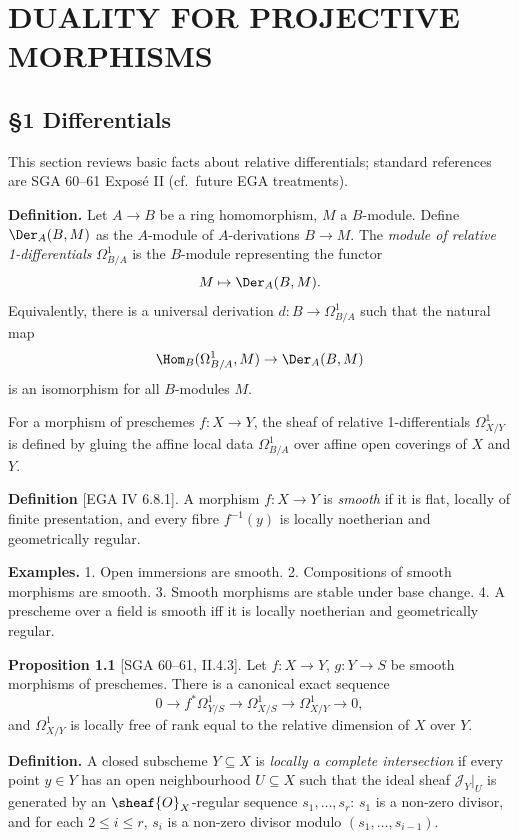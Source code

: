 \setcounter{page}{137}
\chapter{DUALITY FOR PROJECTIVE MORPHISMS}
\section{\S1 Differentials}

This section reviews basic facts about relative differentials; standard references are SGA 60--61 Exposé II (cf.\ future EGA treatments).

\textbf{Definition.}
Let $A\to B$ be a ring homomorphism, $M$ a $B$-module.
Define $\Der_A(B,M)$ as the $A$-module of $A$-derivations $B\to M$.
The \textit{module of relative 1-differentials} $\Omega^1_{B/A}$ is the $B$-module representing the functor
\[
M\mapsto \Der_A(B,M).
\]
Equivalently, there is a universal derivation $d\colon B\to\Omega^1_{B/A}$ such that the natural map
\[
\Hom_B(\Omega^1_{B/A},M) \to \Der_A(B,M)
\]
is an isomorphism for all $B$-modules $M$.

For a morphism of preschemes $f\colon X\to Y$, the sheaf of relative 1-differentials $\Omega^1_{X/Y}$ is defined by gluing the affine local data $\Omega^1_{B/A}$ over affine open coverings of $X$ and $Y$.

\setcounter{page}{138}
\textbf{Definition} [EGA IV 6.8.1].
A morphism $f\colon X\to Y$ is \textit{smooth} if it is flat, locally of finite presentation, and every fibre $f^{-1}(y)$ is locally noetherian and geometrically regular.

\textbf{Examples.}
1. Open immersions are smooth.
2. Compositions of smooth morphisms are smooth.
3. Smooth morphisms are stable under base change.
4. A prescheme over a field is smooth iff it is locally noetherian and geometrically regular.

\textbf{Proposition 1.1} [SGA 60--61, II.4.3].
Let $f\colon X\to Y$, $g\colon Y\to S$ be smooth morphisms of preschemes.
There is a canonical exact sequence
\[
0 \to f^*\Omega^1_{Y/S} \to \Omega^1_{X/S} \to \Omega^1_{X/Y} \to 0,
\]
and $\Omega^1_{X/Y}$ is locally free of rank equal to the relative dimension of $X$ over $Y$.

\textbf{Definition.}
A closed subscheme $Y\subseteq X$ is \textit{locally a complete intersection} if every point $y\in Y$ has an open neighbourhood $U\subseteq X$ such that the ideal sheaf $\mathcal{J}_Y|_U$ is generated by an $\sheaf{O}_X$-regular sequence $s_1,\dots,s_r$:
$s_1$ is a non-zero divisor, and for each $2\le i\le r$, $s_i$ is a non-zero divisor modulo $(s_1,\dots,s_{i-1})$.

